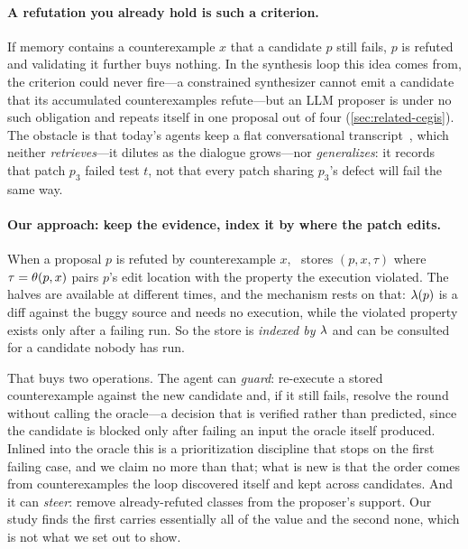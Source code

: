 \paragraph{A refutation you already hold is such a criterion.}
If memory contains a counterexample $x$ that a candidate $p$ still fails, $p$
is refuted and validating it further buys nothing. In the synthesis loop this
idea comes from, the criterion could never fire---a constrained synthesizer
cannot emit a candidate that its accumulated counterexamples refute---but an
LLM proposer is under no such obligation and repeats itself in one proposal out
of four (\cref{sec:related-cegis}). The obstacle is that today's agents keep a
flat conversational transcript~\cite{xia2024chatrepair,shinn2023reflexion,%
chen2024selfdebug}, which neither \emph{retrieves}---it dilutes as the dialogue
grows---nor \emph{generalizes}: it records that patch $p_3$ failed test $t$,
not that every patch sharing $p_3$'s defect will fail the same way.

\paragraph{Our approach: keep the evidence, index it by where the patch edits.}
When a proposal $p$ is refuted by counterexample $x$, \CEGMem\ stores
$(p, x, \tau)$ where $\tau = \theta(p,x)$ pairs $p$'s edit location with the
property the execution violated. The halves are available at different times,
and the mechanism rests on that: $\lambda(p)$ is a diff against the buggy source
and needs no execution, while the violated property exists only after a failing
run. So the store is
\emph{indexed by $\lambda$} and can be consulted for a candidate nobody has run.

That buys two operations. The agent can \emph{guard}: re-execute a stored
counterexample against the new candidate and, if it still fails, resolve the
round without calling the oracle---a decision that is verified rather than
predicted, since the candidate is blocked only after failing an input the
oracle itself produced. Inlined into
the oracle this is a prioritization discipline that stops on the first failing
case, and we claim no more than that; what is new is that the order comes from
counterexamples the loop discovered itself and kept across candidates. And it
can \emph{steer}: remove already-refuted classes from the proposer's support. Our study finds the first
carries essentially all of the value and the second none, which is not what we
set out to show.


